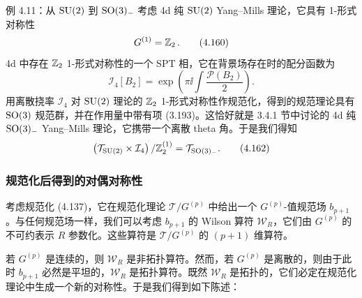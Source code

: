 \begin{examplebox}{例 4.11：从 $\mathrm{SU}(2)$ 到 $\mathrm{SO}(3)_-$}
考虑 4d 纯 $\mathrm{SU}(2)$ Yang--Mills 理论，它具有 1-形式对称性
\begin{equation}
G^{(1)}=\mathbb{Z}_2\,.
\tag{4.160}
\end{equation}
4d 中存在 $\mathbb{Z}_2$ 1-形式对称性的一个 SPT 相，它在背景场存在时的配分函数为
\begin{equation}
\mathcal{I}_4[B_2]=\exp\left(\pi\ii\int\frac{\mathcal{P}(B_2)}{2}\right).
\tag{4.161}
\end{equation}
用离散挠率 $\mathcal{I}_4$ 对 $\mathrm{SU}(2)$ 理论的 $\mathbb{Z}_2$ 1-形式对称性作规范化，得到的规范理论具有 $\mathrm{SO}(3)$ 规范群，并在作用量中带有项 (3.193)。这恰好就是 3.4.1 节中讨论的 4d 纯 $\mathrm{SO}(3)_-$ Yang--Mills 理论，它携带一个离散 theta 角。于是我们得知
\begin{equation}
\left(\mathcal{T}_{\mathrm{SU}(2)}\times\mathcal{I}_4\right)/\mathbb{Z}_2^{(1)}=\mathcal{T}_{\mathrm{SO}(3)_-}.
\tag{4.162}
\end{equation}
\end{examplebox}



\subsubsection{规范化后得到的对偶对称性}

考虑规范化 (4.137)，它在规范化理论 $\mathcal{T}/G^{(p)}$ 中给出一个 $G^{(p)}$-值规范场 $b_{p+1}$。与任何规范场一样，我们可以考虑 $b_{p+1}$ 的 Wilson 算符 $\mathcal{W}_R$，它们由 $G^{(p)}$ 的不可约表示 $R$ 参数化。这些算符是 $\mathcal{T}/G^{(p)}$ 的 $(p+1)$ 维算符。

若 $G^{(p)}$ 是连续的，则 $\mathcal{W}_R$ 是非拓扑算符。然而，若 $G^{(p)}$ 是离散的，则由于此时 $b_{p+1}$ 必然是平坦的，$\mathcal{W}_R$ 是拓扑算符。既然 $\mathcal{W}_R$ 是拓扑的，它们必定在规范化理论中生成一个新的对称性。于是我们得到如下陈述：


